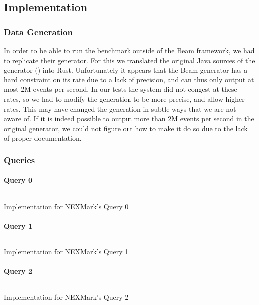 \subsection{Implementation}
\subsubsection{Data Generation}
In order to be able to run the benchmark outside of the Beam framework, we had to replicate their generator. For this we translated the original Java sources of the generator () into Rust. Unfortunately it appears that the Beam generator has a hard constraint on its rate due to a lack of precision, and can thus only output at most 2M events per second. In our tests the system did not congest at these rates, so we had to modify the generation to be more precise, and allow higher rates. This may have changed the generation in subtle ways that we are not aware of. If it is indeed possible to output more than 2M events per second in the original generator, we could not figure out how to make it do so due to the lack of proper documentation.

\subsubsection{Queries}
\paragraph{Query 0}
\begin{listing}[H]
  \inputminted[firstline=396,lastline=396]{rust}{benchmarks/src/nexmark.rs}
  \caption{Implementation for NEXMark's Query 0}
  \label{lst:nexmark-query0}
\end{listing}

\paragraph{Query 1}
\begin{listing}[H]
  \inputminted[firstline=422,lastline=424]{rust}{benchmarks/src/nexmark.rs}
  \caption{Implementation for NEXMark's Query 1}
  \label{lst:nexmark-query1}
\end{listing}

\paragraph{Query 2}
\begin{listing}[H]
  \inputminted[firstline=457,lastline=460]{rust}{benchmarks/src/nexmark.rs}
  \caption{Implementation for NEXMark's Query 2}
  \label{lst:nexmark-query2}
\end{listing}

